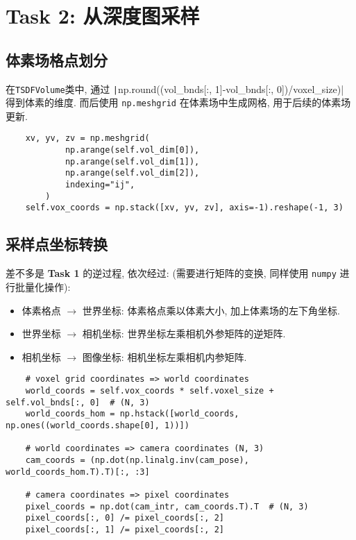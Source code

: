 \documentclass[11pt]{article}
\newcommand\1{\mathds{1}}
\begin{document}
\section{Task 2: 从深度图采样}
\subsection{体素场格点划分}
在\texttt{TSDFVolume}类中, 通过 \texttt|np.round((vol_bnds[:, 1]-vol_bnds[:, 0])/voxel_size)|
得到体素的维度. 而后使用 \texttt{np.meshgrid} 在体素场中生成网格, 用于后续的体素场更新. 
\begin{verbatim}
    xv, yv, zv = np.meshgrid(
            np.arange(self.vol_dim[0]),
            np.arange(self.vol_dim[1]),
            np.arange(self.vol_dim[2]),
            indexing="ij",
        )
    self.vox_coords = np.stack([xv, yv, zv], axis=-1).reshape(-1, 3)
\end{verbatim}
\subsection{采样点坐标转换}
差不多是 \textbf{Task 1} 的逆过程, 依次经过: (需要进行矩阵的变换, 同样使用 \texttt{numpy} 进行批量化操作):
\begin{itemize}
    \item 体素格点 $\to$ 世界坐标: 体素格点乘以体素大小, 加上体素场的左下角坐标.
    \item 世界坐标 $\to$ 相机坐标: 世界坐标左乘相机外参矩阵的逆矩阵.
    \item 相机坐标 $\to$ 图像坐标: 相机坐标左乘相机内参矩阵. 
\end{itemize}
\begin{verbatim}
    # voxel grid coordinates => world coordinates
    world_coords = self.vox_coords * self.voxel_size + self.vol_bnds[:, 0]  # (N, 3)
    world_coords_hom = np.hstack([world_coords, np.ones((world_coords.shape[0], 1))])  

    # world coordinates => camera coordinates (N, 3)
    cam_coords = (np.dot(np.linalg.inv(cam_pose), world_coords_hom.T).T)[:, :3]  

    # camera coordinates => pixel coordinates
    pixel_coords = np.dot(cam_intr, cam_coords.T).T  # (N, 3)
    pixel_coords[:, 0] /= pixel_coords[:, 2]
    pixel_coords[:, 1] /= pixel_coords[:, 2]
\end{verbatim}
\end{document}
